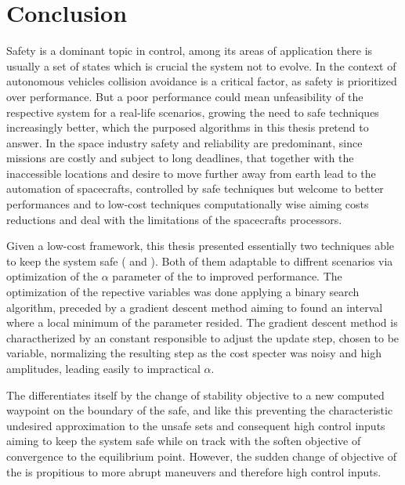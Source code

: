 
%

\chapter{Conclusion}
\label{cha:conclusion}

Safety is a dominant topic in control, among its areas of application there is usually a set of states which is crucial the system not to evolve. In the context of autonomous vehicles collision avoidance is a critical factor, as safety is prioritized over performance. But a poor performance could mean unfeasibility of the respective system for a real-life scenarios, growing the need to safe techniques increasingly better, which the purposed algorithms in this thesis pretend to answer. In the space industry safety and reliability are predominant, since missions are costly and subject to long deadlines, that together with the inaccessible locations and desire to move further away from earth lead to the automation of spacecrafts, controlled by safe techniques but welcome to better performances and to low-cost techniques computationally wise aiming costs reductions and deal with the limitations of the spacecrafts processors.


Given a low-cost  framework, this thesis presented essentially two techniques able to keep the system safe ( and ). Both of them adaptable to diffrent scenarios via optimization of the \(\alpha\) parameter of the  to improved performance. The optimization of the repective variables was done applying a binary search algorithm, preceded by a gradient descent method aiming to found an interval where a local minimum of the parameter resided. The gradient descent method is charactherized by an constant responsible to adjust the update step, chosen to be variable, normalizing the resulting step as the cost specter was noisy and high amplitudes, leading easily to impractical \(\alpha\). 


The  differentiates itself by the change of stability objective to a new computed waypoint on the boundary of the safe, and like this preventing the characteristic  undesired approximation to the unsafe sets and consequent high control inputs aiming to keep the system safe while on track with the soften objective of convergence to the equilibrium point. However, the sudden change of objective of the  is propitious to more abrupt maneuvers and therefore high control inputs.   


